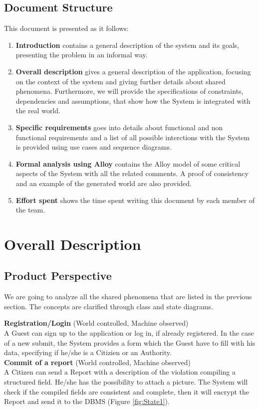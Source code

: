 \documentclass{report}
\begin{document}
\section{Document Structure}
This document is presented as it follows:
\begin{enumerate}
	\item {\textbf{Introduction}} contains a general description of the system and its goals, presenting the problem in an informal way.
	\item{\textbf{Overall description}} gives a general description of the application, focusing on the context of the system and giving further details about shared phenomena. Furthermore, we will provide the specifications of constraints, dependencies and assumptions, that show how the System is integrated with the real world.
	\item{\textbf{Specific requirements}} goes into details about functional and non functional requirements and a list of all possible interctions with the System is provided using use cases and sequence diagrams.
	\item {\textbf{Formal analysis using Alloy}} contains the Alloy model of some critical aspects of the System with all the related comments. A proof of consistency and an example of the generated world are also provided.
	\item {\textbf{Effort spent}} shows the time spent writing this document by each member of the team.
\end{enumerate}

\chapter{Overall Description}
\section{Product Perspective}
We are going to analyze all the shared phenomena that are listed in the previous section. The concepts are clarified through class and state diagrams.\\ \vspace{2mm}

\noindent\textbf{Registration/Login} (World controlled, Machine observed)\\
A Guest can sign up to the application or log in, if already registered. 
In the case of a new submit, the System provides a form which the Guest have to fill with his data, specifying if he/she is 
a Citizien or an Authority.\\ \vspace{2mm}
\noindent\textbf{Commit of a report} (World controlled, Machine observed)\\
A Citizen can send a Report with a description of the violation compiling a structured field. He/she has the possibility to  attach a picture. The System will check if the compiled fields are consistent and complete, then it will encrypt the Report and send it to the DBMS (Figure \ref{fig:State1}). \\ \vspace{2mm}
\end{document}
